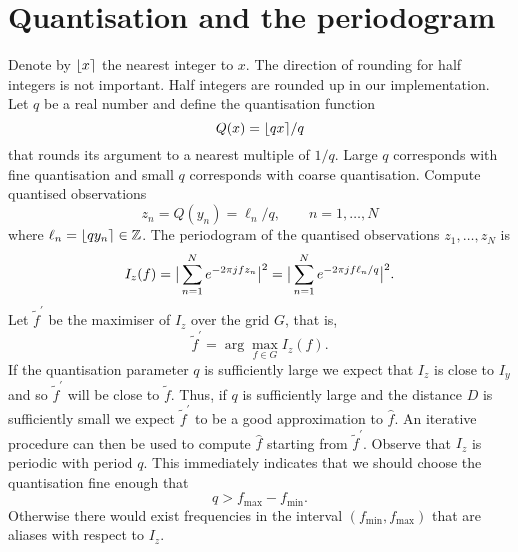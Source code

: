 \documentclass[10pt,twocolumn,twoside]{IEEEtran}
\begin{document}
\section{Quantisation and the periodogram}\label{sec:quant-peri} 

Denote by ${\left\lfloor x \right\rceil}$ the nearest integer to $x$.  The direction of rounding for half integers is not important.  Half integers are rounded up in our implementation.  Let $q$ be a real number and define the quantisation function
\[
Q(x) = {\left\lfloor qx \right\rceil}/q
\]
that rounds its argument to a nearest multiple of $1/q$.  Large $q$ corresponds with fine quantisation and small $q$ corresponds with coarse quantisation.  Compute quantised observations
\[
z_n = Q(y_n) =  \ell_n/q, \qquad n = 1,\dots,N
\]
where $\ell_n = {\left\lfloor qy_n \right\rceil} \in {\mathbb Z}$.  The periodogram of the quantised observations $z_1,\dots,z_N$ is
\begin{align*}
I_z(f) = \big\vert  \sum_{n=1}^N e^{ -2\pi j f z_n}  \big\vert^2 = \big\vert  \sum_{n=1}^N e^{ -2\pi j f \ell_n/q}  \big\vert^2.
\end{align*}
Let $\widetilde{f}^\prime$ be the maximiser of $I_z$ over the grid $G$, that is,
\[
\widetilde{f}^\prime = \arg\max_{f \in G} I_z(f).
\]
If the quantisation parameter $q$ is sufficiently large we expect that $I_z$ is close to $I_y$ and so $\widetilde{f}^\prime$ will be close to $\widetilde{f}$.  Thus, if $q$ is sufficiently large and the distance $D$ is sufficiently small we expect $\widetilde{f}^\prime$ to be a good approximation to $\hat{f}$.  An iterative procedure %
can then be used to compute $\hat{f}$ starting from $\widetilde{f}^\prime$.  
Observe that $I_z$ is periodic with period $q$.  This immediately indicates that we should choose the quantisation fine enough that 
\begin{equation}\label{eq:boundaliasingP}
q > f_{\text{max}} - f_{\text{min}}.
\end{equation}
Otherwise there would exist frequencies in the interval $(f_{\text{min}}, f_{\text{max}})$ that are aliases with respect to $I_z$.  %

\newcommand{\ellmin}{\ell_{\text{min}}}
\newcommand{\ellmax}{\ell_{\text{max}}}
\end{document}
